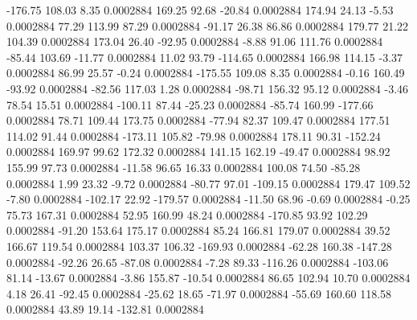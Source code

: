      -176.75      108.03        8.35     0.0002884
      169.25       92.68      -20.84     0.0002884
      174.94       24.13       -5.53     0.0002884
       77.29      113.99       87.29     0.0002884
      -91.17       26.38       86.86     0.0002884
      179.77       21.22      104.39     0.0002884
      173.04       26.40      -92.95     0.0002884
       -8.88       91.06      111.76     0.0002884
      -85.44      103.69      -11.77     0.0002884
       11.02       93.79     -114.65     0.0002884
      166.98      114.15       -3.37     0.0002884
       86.99       25.57       -0.24     0.0002884
     -175.55      109.08        8.35     0.0002884
       -0.16      160.49      -93.92     0.0002884
      -82.56      117.03        1.28     0.0002884
      -98.71      156.32       95.12     0.0002884
       -3.46       78.54       15.51     0.0002884
     -100.11       87.44      -25.23     0.0002884
      -85.74      160.99     -177.66     0.0002884
       78.71      109.44      173.75     0.0002884
      -77.94       82.37      109.47     0.0002884
      177.51      114.02       91.44     0.0002884
     -173.11      105.82      -79.98     0.0002884
      178.11       90.31     -152.24     0.0002884
      169.97       99.62      172.32     0.0002884
      141.15      162.19      -49.47     0.0002884
       98.92      155.99       97.73     0.0002884
      -11.58       96.65       16.33     0.0002884
      100.08       74.50      -85.28     0.0002884
        1.99       23.32       -9.72     0.0002884
      -80.77       97.01     -109.15     0.0002884
      179.47      109.52       -7.80     0.0002884
     -102.17       22.92     -179.57     0.0002884
      -11.50       68.96       -0.69     0.0002884
       -0.25       75.73      167.31     0.0002884
       52.95      160.99       48.24     0.0002884
     -170.85       93.92      102.29     0.0002884
      -91.20      153.64      175.17     0.0002884
       85.24      166.81      179.07     0.0002884
       39.52      166.67      119.54     0.0002884
      103.37      106.32     -169.93     0.0002884
      -62.28      160.38     -147.28     0.0002884
      -92.26       26.65      -87.08     0.0002884
       -7.28       89.33     -116.26     0.0002884
     -103.06       81.14      -13.67     0.0002884
       -3.86      155.87      -10.54     0.0002884
       86.65      102.94       10.70     0.0002884
        4.18       26.41      -92.45     0.0002884
      -25.62       18.65      -71.97     0.0002884
      -55.69      160.60      118.58     0.0002884
       43.89       19.14     -132.81     0.0002884
